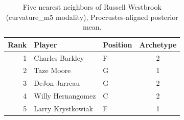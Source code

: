 \begin{table}[htbp]
  \centering\small
  \begin{tabular}{rllc}
    \toprule
    Rank & Player & Position & Archetype \\
    \midrule
    1 & Charles Barkley & F & 2 \\
    2 & Taze Moore & G & 1 \\
    3 & DeJon Jarreau & G & 2 \\
    4 & Willy Hernangomez & C & 2 \\
    5 & Larry Krystkowiak & F & 1 \\
    \bottomrule
  \end{tabular}
  \caption{Five nearest neighbors of Russell Westbrook (curvature_m5 modality), Procrustes-aligned posterior mean.}
  \label{tab:Russell_Westbrook_neighbors_curvature_m5}
\end{table}

